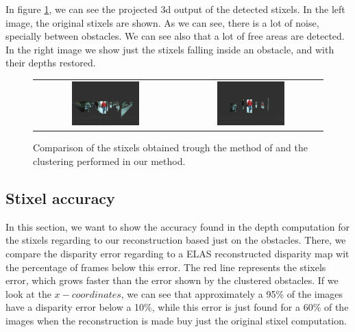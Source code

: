 In figure \ref{fig:cp04_clustering_comparison}, we can see the projected 3d output of the detected stixels. In the left image, the original stixels are shown. As we can see, there is a lot of noise, specially between obstacles. We can see also that a lot of free areas are detected. In the right image we show just the stixels falling inside an obstacle, and with their depths restored.

\begin{figure}[h!]
\begin{tabular}{cc}
\includegraphics[width=0.49\textwidth]{stixelsDetection}\label{fig:cp04_stixels_detection} &
\includegraphics[width=0.49\textwidth]{obstacleDetection}\label{fig:cp04_obstacle_detection}
\end{tabular}
\caption{Comparison of the stixels obtained trough the method of \cite{benenson2012pedestrian} and the clustering performed in our method.}\label{fig:cp04_clustering_comparison}
\end{figure}

\subsection{Stixel accuracy}\label{ch:chapter04_02_02}

In this section, we want to show the accuracy found in the depth computation for the stixels regarding to our reconstruction based just on the obstacles. There, we compare the disparity error regarding to a \ac{ELAS} reconstructed disparity map wit the percentage of frames below this error. The red line represents the stixels error, which grows faster than the error shown by the clustered obstacles. If we look at the $x-coordinates$, we can see that approximately a 95\% of the images have a disparity error below a 10\%, while this error is just found for a 60\% of the images when the reconstruction is made buy just the original stixel computation.

